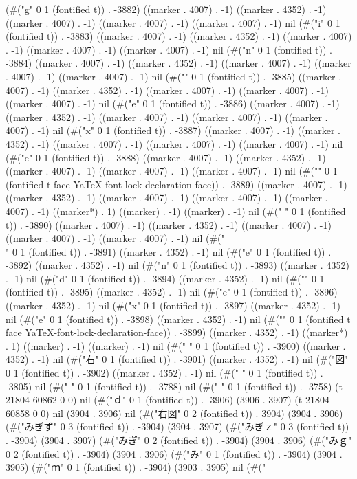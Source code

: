 (#("g" 0 1 (fontified t)) . -3882) ((marker . 4007) . -1) ((marker . 4352) . -1) ((marker . 4007) . -1) ((marker . 4007) . -1) ((marker . 4007) . -1) nil (#("i" 0 1 (fontified t)) . -3883) ((marker . 4007) . -1) ((marker . 4352) . -1) ((marker . 4007) . -1) ((marker . 4007) . -1) ((marker . 4007) . -1) nil (#("n" 0 1 (fontified t)) . -3884) ((marker . 4007) . -1) ((marker . 4352) . -1) ((marker . 4007) . -1) ((marker . 4007) . -1) ((marker . 4007) . -1) nil (#("{" 0 1 (fontified t)) . -3885) ((marker . 4007) . -1) ((marker . 4352) . -1) ((marker . 4007) . -1) ((marker . 4007) . -1) ((marker . 4007) . -1) nil (#("e" 0 1 (fontified t)) . -3886) ((marker . 4007) . -1) ((marker . 4352) . -1) ((marker . 4007) . -1) ((marker . 4007) . -1) ((marker . 4007) . -1) nil (#("x" 0 1 (fontified t)) . -3887) ((marker . 4007) . -1) ((marker . 4352) . -1) ((marker . 4007) . -1) ((marker . 4007) . -1) ((marker . 4007) . -1) nil (#("e" 0 1 (fontified t)) . -3888) ((marker . 4007) . -1) ((marker . 4352) . -1) ((marker . 4007) . -1) ((marker . 4007) . -1) ((marker . 4007) . -1) nil (#("}" 0 1 (fontified t face YaTeX-font-lock-declaration-face)) . -3889) ((marker . 4007) . -1) ((marker . 4352) . -1) ((marker . 4007) . -1) ((marker . 4007) . -1) ((marker . 4007) . -1) ((marker*) . 1) ((marker) . -1) ((marker) . -1) nil (#("
" 0 1 (fontified t)) . -3890) ((marker . 4007) . -1) ((marker . 4352) . -1) ((marker . 4007) . -1) ((marker . 4007) . -1) ((marker . 4007) . -1) nil (#("\\" 0 1 (fontified t)) . -3891) ((marker . 4352) . -1) nil (#("e" 0 1 (fontified t)) . -3892) ((marker . 4352) . -1) nil (#("n" 0 1 (fontified t)) . -3893) ((marker . 4352) . -1) nil (#("d" 0 1 (fontified t)) . -3894) ((marker . 4352) . -1) nil (#("{" 0 1 (fontified t)) . -3895) ((marker . 4352) . -1) nil (#("e" 0 1 (fontified t)) . -3896) ((marker . 4352) . -1) nil (#("x" 0 1 (fontified t)) . -3897) ((marker . 4352) . -1) nil (#("e" 0 1 (fontified t)) . -3898) ((marker . 4352) . -1) nil (#("}" 0 1 (fontified t face YaTeX-font-lock-declaration-face)) . -3899) ((marker . 4352) . -1) ((marker*) . 1) ((marker) . -1) ((marker) . -1) nil (#("
" 0 1 (fontified t)) . -3900) ((marker . 4352) . -1) nil (#("右" 0 1 (fontified t)) . -3901) ((marker . 4352) . -1) nil (#("図" 0 1 (fontified t)) . -3902) ((marker . 4352) . -1) nil (#(" " 0 1 (fontified t)) . -3805) nil (#(" " 0 1 (fontified t)) . -3788) nil (#(" " 0 1 (fontified t)) . -3758) (t 21804 60862 0 0) nil (#("ｄ" 0 1 (fontified t)) . -3906) (3906 . 3907) (t 21804 60858 0 0) nil (3904 . 3906) nil (#("右図" 0 2 (fontified t)) . 3904) (3904 . 3906) (#("みぎず" 0 3 (fontified t)) . -3904) (3904 . 3907) (#("みぎｚ" 0 3 (fontified t)) . -3904) (3904 . 3907) (#("みぎ" 0 2 (fontified t)) . -3904) (3904 . 3906) (#("みｇ" 0 2 (fontified t)) . -3904) (3904 . 3906) (#("み" 0 1 (fontified t)) . -3904) (3904 . 3905) (#("ｍ" 0 1 (fontified t)) . -3904) (3903 . 3905) nil (#("
